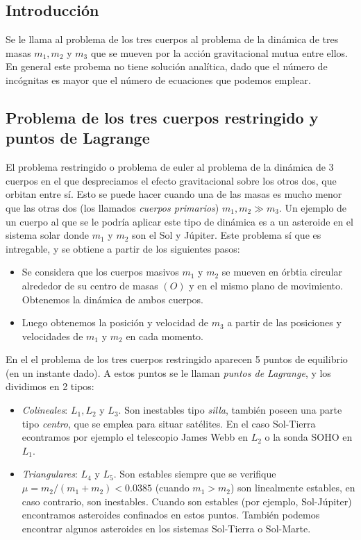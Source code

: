 \subsection{Introducción}

Se le llama al problema de los tres cuerpos al problema de la dinámica de tres masas $m_1,m_2$ y $m_3$ que se mueven por la acción gravitacional mutua entre ellos. En general este probema no tiene solución analítica, dado que el número de incógnitas es mayor que el número de ecuaciones que podemos emplear.

\subsection{Problema de los tres cuerpos restringido y puntos de Lagrange}

El problema restringido o problema de euler al problema de la dinámica de 3 cuerpos en el que despreciamos el efecto gravitacional sobre los otros dos, que orbitan entre sí. Esto se puede hacer cuando una de las masas es mucho menor que las otras dos (los llamados \textit{cuerpos primarios}) $m_1,m_2\gg m_3$. Un ejemplo de un cuerpo al que se le podría aplicar este tipo de dinámica es a un asteroide en el sistema solar donde $m_1$ y $m_2$ son el Sol y Júpiter. Este problema sí que es intregable, y se obtiene a partir de los siguientes pasos:

\begin{itemize}
	\item Se considera que los cuerpos masivos $m_1$ y $m_2$ se mueven en órbtia circular alrededor de su centro de masas $(O)$ y en el mismo plano de movimiento. Obtenemos la dinámica de ambos cuerpos.
	\item Luego obtenemos la posición y velocidad de $m_3$ a partir de las posiciones y velocidades de $m_1$ y $m_2$ en cada momento.
\end{itemize}
En el el problema de los tres cuerpos restringido aparecen 5 puntos de equilibrio (en un instante dado). A estos puntos se le llaman \textit{puntos de Lagrange}, y los dividimos en 2 tipos:

\begin{itemize}
	\item \textit{Colineales}: $L_1,L_2$ y $L_3$. Son inestables tipo \textit{silla}, también poseen una parte tipo \textit{centro}, que se emplea para situar satélites. En el caso Sol-Tierra econtramos por ejemplo el telescopio James Webb en $L_2$ o la sonda SOHO en $L_1$.
	\item \textit{Triangulares}: $L_4$ y $L_5$. Son estables siempre que se verifique $\mu=m_2/(m_1+m_2)<0.0385$ (cuando $m_1>m_2$) son linealmente estables, en caso contrario, son inestables. Cuando son estables (por ejemplo, Sol-Júpiter) encontramos asteroides confinados en estos puntos. También podemos encontrar algunos asteroides en los sistemas Sol-Tierra o Sol-Marte.
\end{itemize}





